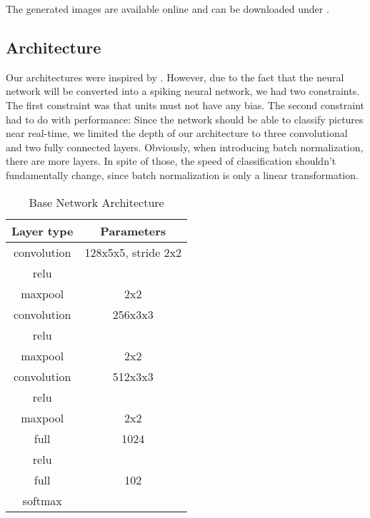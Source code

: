 \documentclass[a4paper, 11pt]{article}
\begin{document}
The generated images are available online and can be downloaded under \cite{UnternaehrerGenImg}.


\subsection{Architecture}
Our architectures were inspired by \citet{Simonyan2015}.
However, due to the fact that the neural network will be converted into a spiking neural network, we had two constraints.
The first constraint was that units must not have any bias.
The second constraint had to do with performance: Since the network should be able to classify pictures near real-time, we limited the depth of our architecture to three convolutional and two fully connected layers.
Obviously, when introducing batch normalization, there are more layers.
In spite of those, the speed of classification shouldn't fundamentally change, since batch normalization is only a linear transformation.


\begin{table}[!h]
	\begin{center}
		\begin{tabular}{|c|c|}
			\hline Layer type & Parameters \\ 
			\hline convolution & 128x5x5, stride 2x2 \\ 
			\hline relu &\\
			\hline maxpool &  2x2\\ 
			\hline convolution & 256x3x3 \\ 
			\hline relu &\\
			\hline maxpool &  2x2\\ 
			\hline convolution & 512x3x3 \\ 
			\hline relu &\\
			\hline maxpool &  2x2\\ 
			\hline full &  1024 \\ 
			\hline relu &\\
			\hline full &  102 \\
			\hline softmax & \\
			\hline
		\end{tabular}
	\end{center}
	\caption{Base Network Architecture}
\end{table}
\end{document}
